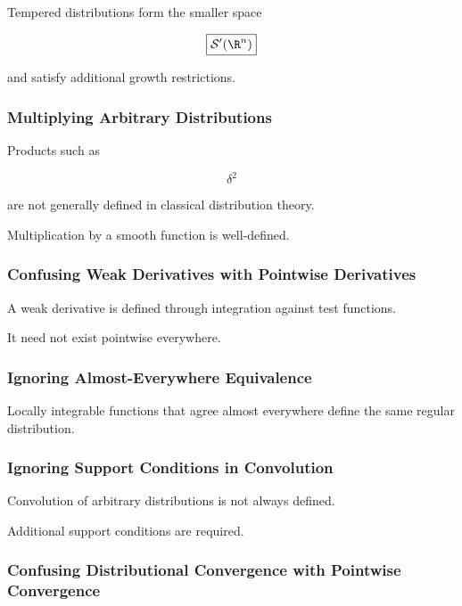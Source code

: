 Tempered distributions form the smaller space

\[
\boxed{
\mathcal{S}'(\R^n)
}
\]

and satisfy additional growth restrictions.

\subsubsection{Multiplying Arbitrary Distributions}

Products such as

\[
\delta^2
\]

are not generally defined in classical distribution theory.

Multiplication by a smooth function is well-defined.

\subsubsection{Confusing Weak Derivatives with Pointwise Derivatives}

A weak derivative is defined through integration against test functions.

It need not exist pointwise everywhere.

\subsubsection{Ignoring Almost-Everywhere Equivalence}

Locally integrable functions that agree almost everywhere define the same
regular distribution.

\subsubsection{Ignoring Support Conditions in Convolution}

Convolution of arbitrary distributions is not always defined.

Additional support conditions are required.

\subsubsection{Confusing Distributional Convergence with Pointwise Convergence}

